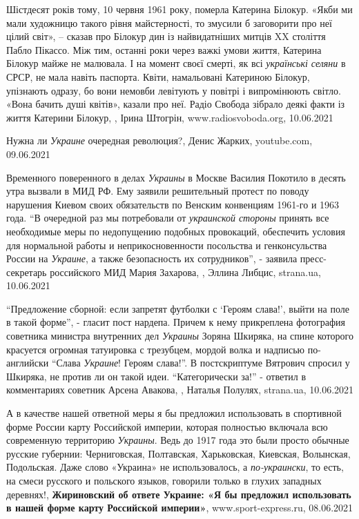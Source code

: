 Шістдесят років тому, 10 червня 1961 року, померла Катерина Білокур. «Якби ми
мали художницю такого рівня майстерності, то змусили б заговорити про неї цілий
світ», – сказав про Білокур дин із найвидатніших митців XX століття Пабло
Пікассо. Між тим, останні роки через важкі умови життя, Катерина Білокур майже
не малювала. І на момент своєї смерті, як всі \emph{українські селяни} в СРСР,
не мала навіть паспорта. Квіти, намальовані Катериною Білокур, упізнають
одразу, бо вони немовби левітують у повітрі і випромінюють світло. «Вона бачить
душі квітів», казали про неї. Радіо Свобода зібрало деякі факти із життя
Катерини Білокур,
, Ірина Штогрін, www.radiosvoboda.org, 10.06.2021

Нужна ли \emph{Украине} очередная революция?, Денис Жарких, youtube.com, 09.06.2021

Временного поверенного в делах \emph{Украины} в Москве Василия Покотило в десять утра
вызвали в МИД РФ. Ему заявили решительный протест по поводу нарушения Киевом
своих обязательств по Венским конвенциям 1961-го и 1963 года.  \enquote{В очередной раз
мы потребовали от \emph{украинской стороны} принять все необходимые меры по
недопущению подобных провокаций, обеспечить условия для нормальной работы и
неприкосновенности посольства и генконсульства России на \emph{Украине}, а также
безопасность их сотрудников}, - заявила пресс-секретарь российского МИД Мария
Захарова,
, 
Эллина Либцис, strana.ua, 10.06.2021

\enquote{Предложение сборной: если запретят футболки с 
\enquote{Героям слава!}, выйти на поле в такой форме}, - гласит пост нардепа.
Причем к нему прикреплена фотография советника министра внутренних дел \emph{Украины}
Зоряна Шкиряка, на спине которого красуется огромная татуировка с трезубцем,
мордой волка и надписью по-английски \enquote{Слава \emph{Украине}! Героям слава!}.
В постскриптуме Вятрович спросил у Шкиряка, не против ли он такой идеи. 
\enquote{Категорически за!} - ответил в комментариях советник Арсена Авакова,
, Наталья Полулях, strana.ua, 10.06.2021

А в качестве нашей ответной меры я бы предложил использовать в спортивной форме
России карту Российской империи, которая полностью включала всю современную
территорию \emph{Украины}. Ведь до 1917 года это были просто обычные русские губернии:
Черниговская, Полтавская, Харьковская, Киевская, Волынская, Подольская. Даже
слово «Украина» не использовалось, а \emph{по-украински}, то есть, на смеси русского и
польского языков, говорили только в глухих западных деревнях!,
\textbf{Жириновский об ответе Украине: «Я бы предложил использовать в нашей форме карту Российской империи»},
www.sport-express.ru, 08.06.2021

